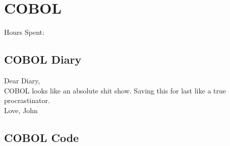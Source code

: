 \documentclass{article}
\begin{document}
\section*{COBOL}
Hours Spent: 

\subsection*{COBOL Diary}
Dear Diary,
\\
COBOL looks like an absolute shit show. Saving this for last like a true procrastinator.
\\
Love, John

\subsection*{COBOL Code}
\end{document}
